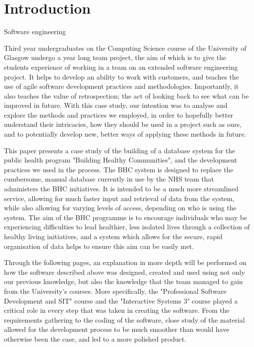 \documentclass{l3proj}
\begin{document}
\educationalconsent

\newpage

\section{Introduction}

Software engineering

Third year undergraduates on the Computing Science course of the University of Glasgow undergo a year long team project, the aim of which is to give the students experience of working in a team on an extended software engineering project. It helps to develop an ability to work with customers, and teaches the use of agile software development practices and methodologies. Importantly, it also teaches the value of retrospection; the act of looking back to see what can be improved in future. With this case study, our intention was to analyse and explore the methods and practices we employed, in order to hopefully better understand their intricacies, how they should be used in a project such as ours, and to potentially develop new, better ways of applying these methods in future.

This paper presents a case study of the building of a database system for the public health program "Building Healthy Communities", and the development practices we used in the process. The BHC system is designed to replace the cumbersome, manual database currently in use by the NHS team that administers the BHC initiatives. It is intended to be a much more streamlined service, allowing for much faster input and retrieval of data from the system, while also allowing for varying levels of access, depending on who is using the system. The aim of the BHC programme is to encourage individuals who may be experiencing difficulties to lead healthier, less isolated lives through a collection of healthy living initiatives, and a system which allows for the secure, rapid organisation of data helps to ensure this aim can be easily met.

Through the following pages, an explanation in more depth will be performed on how the software described above was designed, created and used using not only our previous knowledge, but also the knowledge that the team managed to gain from the University's courses. More specifically, the "Professional Software Development and SIT" course and the "Interactive Systems 3" course played a critical role in every step that was taken in creating the software. From the requirements gathering to the coding of the software, close study of the material allowed for the development process to be much smoother than would have otherwise been the case, and led to a more polished product.
\end{document}
